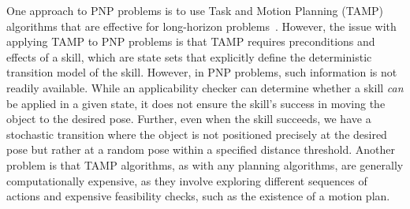 
One approach to PNP problems is to use Task and Motion Planning (TAMP) algorithms that are effective for long-horizon problems~\cite{garrett2021integrated}. However, the issue with applying TAMP to PNP problems is that TAMP requires 
preconditions and effects of a skill, which are state sets that explicitly define the deterministic transition model of the skill. However, in PNP problems, such information is not readily available. While an applicability checker can determine whether a skill \emph{can} be applied in a given state, it does not ensure the skill's success in moving the object to the desired pose. Further, even when the skill succeeds, we have a stochastic transition where the object is not positioned precisely at the desired pose but rather at a random pose within a specified distance threshold.  Another problem is that TAMP algorithms, as with any planning algorithms, are generally computationally expensive, as they involve exploring different sequences of actions and expensive feasibility checks, such as the existence of a motion plan.


